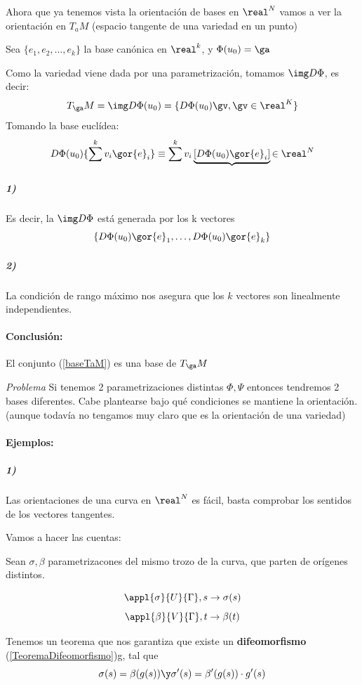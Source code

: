 Ahora que ya tenemos vista la orientación de bases en $\real^N$ vamos a ver la orientación en $T_a M$ (espacio tangente de una variedad en un punto)


Sea $\{e_1,e_2,\dotsc,e_k\}$ la base canónica en $\real^k$, y $\Phi(u_0)=\ga$

Como la variedad viene dada por una parametrización, tomamos $\img D\Phi$, es decir: \[T_{\ga}M = \img D\Phi(u_0)  = \{D\Phi(u_0)\gv,\gv\in\real^K\}\]
Tomando la base euclídea:
\[D\Phi(u_0) \{\sum^k v_i\gor{e}_i\}\equiv \sum^k v_i\underbrace{[D\Phi(u_0)\gor{e}_i]}{\in\real^N} \]

\subparagraph{1)}Es decir, la $\img D\Phi$ está generada por los k vectores \begin{equation}\label{baseTaM}
\{ D\Phi(u_0)\gor{e}_1,\dotsc ,D\Phi(u_0)\gor{e}_k \}
\end{equation}

\subparagraph{2)}
La condición de rango máximo nos asegura que los $k$ vectores son linealmente independientes.

\paragraph{Conclusión:} El conjunto (\ref{baseTaM}) es una base de $T_{\ga}M$

\textit{Problema} Si tenemos 2 parametrizaciones distintas $\Phi,\Psi$ entonces tendremos 2 bases diferentes. Cabe plantearse bajo qué condiciones se mantiene la orientación. (aunque todavía no tengamos muy claro que es la orientación de una variedad)

\paragraph{Ejemplos:}
\subparagraph{1)} Las orientaciones de una curva en $\real^N$ es fácil, basta comprobar los sentidos de los vectores tangentes. 

Vamos a hacer las cuentas:

Sean $\sigma,\beta$ parametrizacones del mismo trozo de la curva, que parten de orígenes distintos.

\[\appl{\sigma}{U}{\Gamma},s\to \sigma(s)\]
\[\appl{\beta}{V}{\Gamma},t\to \beta(t)\]

Tenemos un teorema que nos garantiza que existe un \textbf{difeomorfismo} (\ref{TeoremaDifeomorfismo})g, tal que \[\sigma(s) = \beta(g(s)) \y \sigma'(s) = \beta'(g(s))\cdot g'(s)\]

